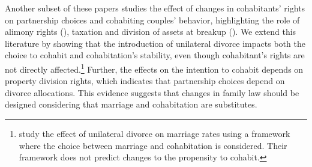 \documentclass[12pt]{article}
\numberwithin{table}{section}
\begin{document}
Another subset of these papers studies the effect of changes in cohabitants' rights on partnership choices and cohabiting couples' behavior, highlighting the role of alimony rights  (\citealp{chiappori2017,gousse2018}), taxation \cite{leturcq2012} and division of assets at breakup (\citealp{fisher2012,gousse2018,chigavazira2019}). We extend this literature by showing that the introduction of unilateral divorce impacts both the choice to cohabit and cohabitation's stability, even though cohabitant's rights are not directly affected.\footnote{\cite{matouschek2008} study the effect of unilateral divorce on marriage rates using a framework where the choice between marriage and cohabitation is considered. Their framework does not predict changes to the propensity to cohabit.} Further, the effects on the intention to cohabit depends on property division rights, which indicates that partnership choices depend on divorce allocations. This evidence suggests that changes in family law should be designed considering that marriage and cohabitation are substitutes. 
\end{document}
